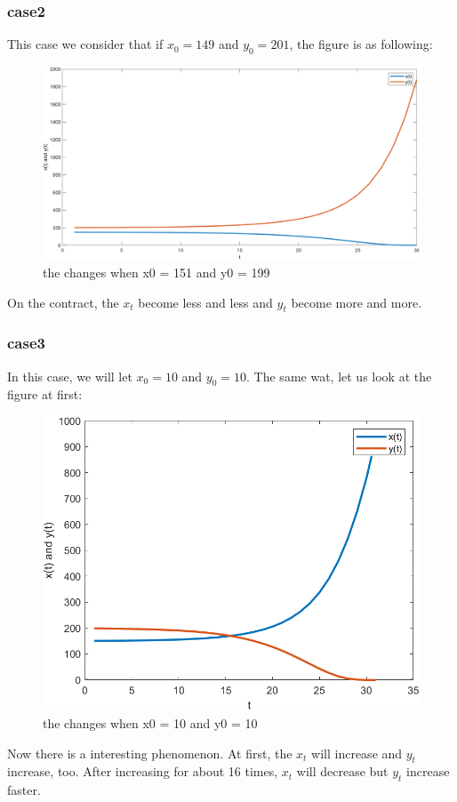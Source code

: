 \documentclass[12pt]{article}
\begin{document}
\subsubsection{case2}
This case we consider that if $x_0 = 149$ and $y_0 = 201$, the figure is as following:
    \begin{figure}[H]
    \centering
    \includegraphics[scale=0.3]{numbers_2.png}
    \caption{the changes when x0 = 151 and y0 = 199}
    \label{fig:my_label}
\end{figure}
On the contract, the $x_t$ become less and less and $y_t$ become more and more.
\subsubsection{case3}
In this case, we will let $x_0 = 10$ and $y_0 = 10$. The same wat, let us look at the figure at first:
    \begin{figure}[H]
    \centering
    \includegraphics[scale=0.5]{numbers_1.png}
    \caption{the changes when x0 = 10 and y0 = 10}
    \label{fig:my_label}
\end{figure}
Now there is a interesting phenomenon. At first, the $x_t$ will increase and $y_t$ increase, too. After increasing for about 16 times, $x_t$ will decrease but $y_t$ increase faster.
\end{document}
